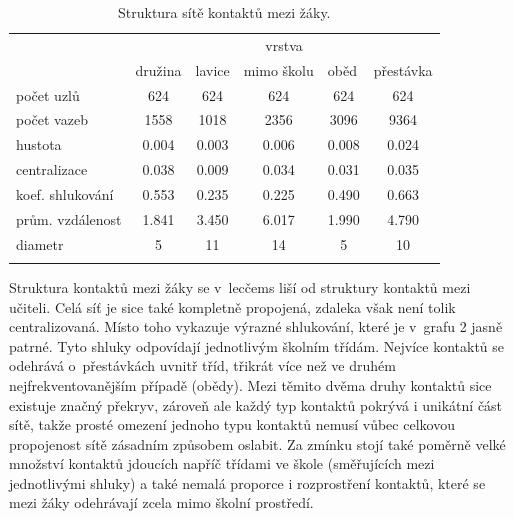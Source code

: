 \begin{table}
    \centering
    \caption{Struktura sítě kontaktů mezi žáky.}
\begin{tabular}{lccccc}
\hline
                 & \multicolumn{5}{c}{vrstva}                                                                                                                           \\ 
                 & \multicolumn{1}{l}{družina} & \multicolumn{1}{l}{lavice} & \multicolumn{1}{l}{mimo školu} & \multicolumn{1}{l}{oběd} & \multicolumn{1}{l}{přestávka} \\ \hline
počet uzlů       & 624                         & 624                        & 624                            & 624                      & 624                           \\
počet vazeb      & 1558                        & 1018                       & 2356                           & 3096                     & 9364                          \\
hustota          & 0.004                       & 0.003                      & 0.006                          & 0.008                    & 0.024                         \\
centralizace     & 0.038                       & 0.009                      & 0.034                          & 0.031                    & 0.035                         \\
koef. shlukování & 0.553                       & 0.235                      & 0.225                          & 0.490                    & 0.663                         \\
prům. vzdálenost & 1.841                       & 3.450                      & 6.017                          & 1.990                    & 4.790                         \\
diametr          & 5                           & 11                         & 14                             & 5                        & 10                            \\ \hline
\label{tab:100-students}
\end{tabular}
\end{table}

Struktura kontaktů mezi žáky se v~lecčems liší od struktury kontaktů mezi učiteli. Celá síť je sice také kompletně propojená, zdaleka však není tolik centralizovaná. Místo toho vykazuje výrazné shlukování, které je v~grafu 2 jasně patrné. Tyto shluky odpovídají jednotlivým školním třídám. Nejvíce kontaktů se odehrává o~přestávkách uvnitř tříd, třikrát více než ve druhém nejfrekventovanějším případě (obědy). Mezi těmito dvěma druhy kontaktů sice existuje značný překryv, zároveň ale každý typ kontaktů pokrývá i unikátní část sítě, takže prosté omezení jednoho typu kontaktů nemusí vůbec celkovou propojenost sítě zásadním způsobem oslabit. Za zmínku stojí také poměrně velké množství kontaktů jdoucích napříč třídami ve škole (směřujících mezi jednotlivými shluky) a také nemalá proporce i rozprostření kontaktů, které se mezi žáky odehrávají zcela mimo školní prostředí. 


